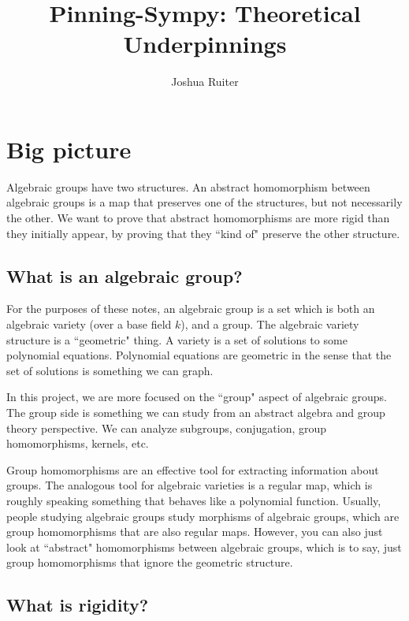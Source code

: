 \documentclass[12pt]{article}
\title{Pinning-Sympy: Theoretical Underpinnings}
\author{Joshua Ruiter}
\theoremstyle{definition}
\begin{document}
\maketitle
\tableofcontents

\newpage

\section{Big picture}

Algebraic groups have two structures. An abstract homomorphism between algebraic groups is a map that preserves one of the structures, but not necessarily the other. We want to prove that abstract homomorphisms are more rigid than they initially appear, by proving that they ``kind of" preserve the other structure.

\subsection{What is an algebraic group?}

For the purposes of these notes, an algebraic group is a set which is both an algebraic variety (over a base field $k$), and a group. The algebraic variety structure is a ``geometric" thing. A variety is a set of solutions to some polynomial equations. Polynomial equations are geometric in the sense that the set of solutions is something we can graph. 

In this project, we are more focused on the ``group" aspect of algebraic groups. The group side is something we can study from an abstract algebra and group theory perspective. We can analyze subgroups, conjugation, group homomorphisms, kernels, etc. 

Group homomorphisms are an effective tool for extracting information about groups. The analogous tool for algebraic varieties is a regular map, which is roughly speaking something that behaves like a polynomial function. Usually, people studying algebraic groups study morphisms of algebraic groups, which are group homomorphisms that are also regular maps. However, you can also just look at ``abstract" homomorphisms between algebraic groups, which is to say, just group homomorphisms that ignore the geometric structure.

\subsection{What is rigidity?}
\end{document}
